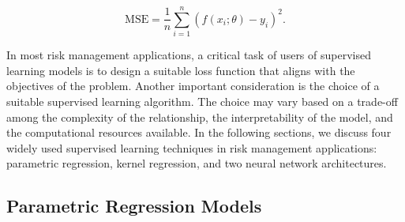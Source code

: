 \begin{equation} \label{eq:mse}
    \text{MSE} = \frac{1}{n} \sum_{i=1}^{n} (f(x_i;\theta) - y_i)^2.
\end{equation}

In most risk management applications, a critical task of users of supervised learning models is to design a suitable loss function that aligns with the objectives of the problem.
Another important consideration is the choice of a suitable supervised learning algorithm.
The choice may vary based on a trade-off among the complexity of the relationship, the interpretability of the model, and the computational resources available.
In the following sections, we discuss four widely used supervised learning techniques in risk management applications: parametric regression, kernel regression, and two neural network architectures.

\subsection{Parametric Regression Models}

